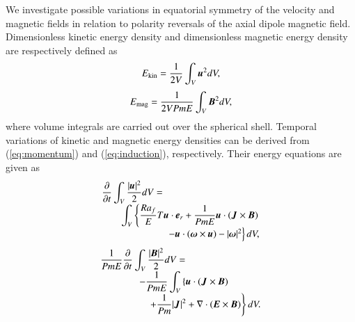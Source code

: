 {\color{red}
We investigate possible variations in equatorial symmetry of the velocity and magnetic fields in relation to polarity reversals of the axial dipole magnetic field.
}
Dimensionless kinetic energy density and dimensionless magnetic energy density are respectively defined as
%
\begin{equation}
E_{\rm kin} = \frac{1}{2 V}
  \int_V \mbox{\boldmath$u$}^2 d V ,
\label{eq:Ekin}
\end{equation}
%
\begin{equation}
E_{\rm mag} = \frac{1}{2 V Pm E}
  \int_V \mbox{\boldmath$B$}^2 d V ,
\label{eq:Emag}
\end{equation}
%
{\color{red}
where volume integrals are carried out over the spherical shell.
}
Temporal variations of kinetic and magnetic energy densities can be derived from (\ref{eq:momentum}) and (\ref{eq:induction}), respectively.
Their energy equations are given as
%
\begin{equation}
\begin{array}{l}
\displaystyle
\frac{\partial}{\partial t}
 \int_V \frac{|\bvec{u}|^2}{2} d V =
\\
\displaystyle
\hfill
\hspace*{2em}
\int_V \left\{
      \frac{Ra_f}{E}T \bvec{u}\cdot \bvec{e}_r
    + \frac{1}{Pm E} \bvec{u} \cdot
                     (\bvec{J} \times \bvec{B})
      \right.
\\
\hfill
      \left.
    - \bvec{u} \cdot (\bvec{\omega}\times\bvec{u})
    - |\bvec{\omega}|^2 
      \right\} d V,
\end{array}
\label{eq:energy_u}
\end{equation}
%
\begin{equation}
\begin{array}{l}
\displaystyle
\frac{1}{Pm E}\frac{\partial}{\partial t}
 \int_V \frac{|\mbox{\boldmath$B$}|^2}{2} d V =
\\
\hspace*{4em}
\displaystyle
- \frac{1}{Pm E}\int_V \left\{
      \mbox{\boldmath$u$} \cdot ( \mbox{\boldmath$J$} \times \mbox{\boldmath$B$} )
    \right.
\\
\hspace{5em}
\displaystyle
    \left.
    + \frac{1}{Pm} |\mbox{\boldmath$J$}|^2
    + \nabla \cdot ( \mbox{\boldmath$E$} \times \mbox{\boldmath$B$} ) 
      \right\} d V.
\end{array}
\label{eq:energy_B}
\end{equation}
%
